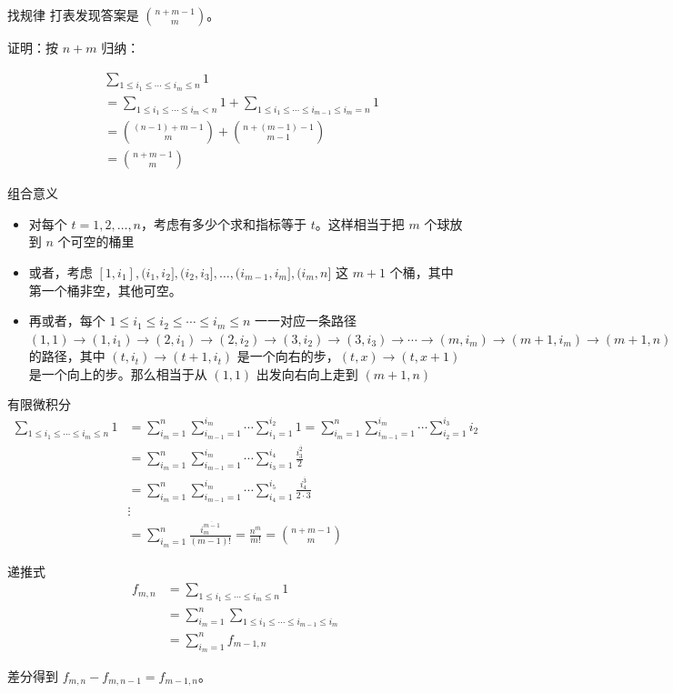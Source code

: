\begin{frame}{找规律}
    打表发现答案是 $\binom{n+m-1}{m}$。

    证明：按 $n+m$ 归纳：

    $$
    \begin{aligned}
    &\sum_{1\le i_1\le \cdots\le i_m\le n}1\\
    &=\sum_{1\le i_1\le \cdots\le i_m<n}1+\sum_{1\le i_1\le \cdots\le i_{m-1}\le i_m=n}1\\
    &=\binom{(n-1)+m-1}{m}+\binom{n+(m-1)-1}{m-1}\\
    &=\binom{n+m-1}{m}
    \end{aligned}
    $$
\end{frame}
\begin{frame}{组合意义}
    \begin{itemize}
        \item 对每个 $t=1,2,\ldots,n$，考虑有多少个求和指标等于 $t$。这样相当于把 $m$ 个球放到 $n$ 个可空的桶里
        \item 或者，考虑 $[1,i_1],(i_1,i_2],(i_2,i_3],\ldots,(i_{m-1},i_m],(i_m,n]$ 这 $m+1$ 个桶，其中第一个桶非空，其他可空。
        \item 再或者，每个 $1\le i_1\le i_2\le\cdots\le i_m\le n$ 一一对应一条路径 $(1,1)\to (1,i_1)\to (2,i_1)\to (2,i_2)\to (3,i_2)\to (3,i_3)\to\cdots\to (m,i_m)\to (m+1,i_{m})\to (m+1,n)$ 的路径，其中 $(t,i_t)\to (t+1,i_t)$ 是一个向右的步，$(t,x)\to (t,x+1)$ 是一个向上的步。那么相当于从 $(1,1)$ 出发向右向上走到 $(m+1,n)$
    \end{itemize}
\end{frame}
\begin{frame}{有限微积分}
    $$
    \begin{aligned}
    \sum_{1\le i_1\le \cdots\le i_m\le n}1
    &=\sum_{i_m=1}^n\sum_{i_{m-1}=1}^{i_m}\cdots\sum_{i_1=1}^{i_2}1=\sum_{i_m=1}^n\sum_{i_{m-1}=1}^{i_m}\cdots\sum_{i_2=1}^{i_3}i_2\\
    &=\sum_{i_m=1}^n\sum_{i_{m-1}=1}^{i_m}\cdots\sum_{i_3=1}^{i_4}\frac{i_3^{\overline{2}}}{2}\\
    &=\sum_{i_m=1}^n\sum_{i_{m-1}=1}^{i_m}\cdots\sum_{i_4=1}^{i_5}\frac{i_4^{\overline{3}}}{2\cdot 3}\\
    &\vdots\\
    &=\sum_{i_m=1}^n\frac{i_m^{\overline{m-1}}}{(m-1)!}=\frac{n^{\overline{m}}}{m!}=\binom{n+m-1}{m}
    \end{aligned}
    $$
\end{frame}
\begin{frame}{递推式}
    $$
    \begin{aligned}
    f_{m,n}&=\sum_{1\le i_1\le \cdots\le i_m\le n}1\\
    &=\sum_{i_m=1}^n\sum_{1\le i_1\le\cdots \le i_{m-1}\le i_m}\\
    &=\sum_{i_m=1}^n f_{m-1,n}
    \end{aligned}
    $$

    差分得到 $f_{m,n}-f_{m,n-1}=f_{m-1,n}$。
\end{frame}
